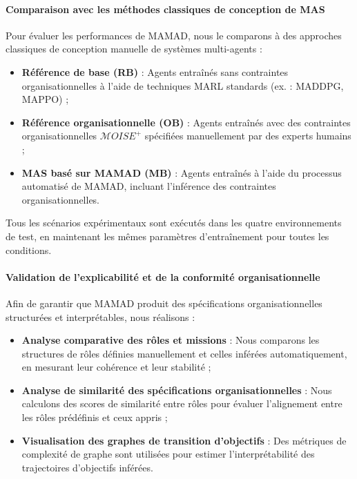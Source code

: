 \paragraph{Comparaison avec les méthodes classiques de conception de MAS}

Pour évaluer les performances de MAMAD, nous le comparons à des approches classiques de conception manuelle de systèmes multi-agents :

\begin{itemize}
    \item \textbf{Référence de base (RB)} : Agents entraînés sans contraintes organisationnelles à l'aide de techniques MARL standards (ex. : MADDPG, MAPPO) ;
    \item \textbf{Référence organisationnelle (OB)} : Agents entraînés avec des contraintes organisationnelles $\mathcal{M}OISE^+$ spécifiées manuellement par des experts humains ;
    \item \textbf{MAS basé sur MAMAD (MB)} : Agents entraînés à l'aide du processus automatisé de MAMAD, incluant l'inférence des contraintes organisationnelles.
\end{itemize}

Tous les scénarios expérimentaux sont exécutés dans les quatre environnements de test, en maintenant les mêmes paramètres d'entraînement pour toutes les conditions.

\paragraph{Validation de l'explicabilité et de la conformité organisationnelle}

Afin de garantir que MAMAD produit des spécifications organisationnelles structurées et interprétables, nous réalisons :

\begin{itemize}
    \item \textbf{Analyse comparative des rôles et missions} : Nous comparons les structures de rôles définies manuellement et celles inférées automatiquement, en mesurant leur cohérence et leur stabilité ;
    \item \textbf{Analyse de similarité des spécifications organisationnelles} : Nous calculons des scores de similarité entre rôles pour évaluer l'alignement entre les rôles prédéfinis et ceux appris ;
    \item \textbf{Visualisation des graphes de transition d'objectifs} : Des métriques de complexité de graphe sont utilisées pour estimer l'interprétabilité des trajectoires d'objectifs inférées.
\end{itemize}

